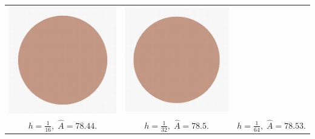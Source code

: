 \begin{frame}
\begin{tabular}{ccc}
\includegraphics[scale=0.4]{figures/motivation/digital-geometric-estimators/multigrid/h003125.png} &
\includegraphics[scale=0.4]{figures/motivation/digital-geometric-estimators/multigrid/h003125.png} \\
$h=\frac{1}{16},\; \hat{A}=78.44.$ & $h=\frac{1}{32},\; \hat{A}=78.5.$ & $h=\frac{1}{64},\; \hat{A}=78.53.$
\end{tabular}

\end{frame}

